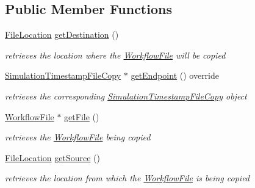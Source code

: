 \subsection*{Public Member Functions}
\begin{DoxyCompactItemize}
\item 
\hyperlink{structwrench_1_1_simulation_timestamp_file_copy_1_1_file_location}{File\+Location} \hyperlink{classwrench_1_1_simulation_timestamp_file_copy_a18c0be71ae79818fe8d0300b08bb2238}{get\+Destination} ()
\begin{DoxyCompactList}\small\item\em retrieves the location where the \hyperlink{classwrench_1_1_workflow_file}{Workflow\+File} will be copied \end{DoxyCompactList}\item 
\hyperlink{classwrench_1_1_simulation_timestamp_file_copy}{Simulation\+Timestamp\+File\+Copy} $\ast$ \hyperlink{classwrench_1_1_simulation_timestamp_file_copy_a2cd940b53a294459ebcab5bce823c9a0}{get\+Endpoint} () override
\begin{DoxyCompactList}\small\item\em retrieves the corresponding \hyperlink{classwrench_1_1_simulation_timestamp_file_copy}{Simulation\+Timestamp\+File\+Copy} object \end{DoxyCompactList}\item 
\hyperlink{classwrench_1_1_workflow_file}{Workflow\+File} $\ast$ \hyperlink{classwrench_1_1_simulation_timestamp_file_copy_a20275ad1b9f85099fed946e656420e1c}{get\+File} ()
\begin{DoxyCompactList}\small\item\em retrieves the \hyperlink{classwrench_1_1_workflow_file}{Workflow\+File} being copied \end{DoxyCompactList}\item 
\hyperlink{structwrench_1_1_simulation_timestamp_file_copy_1_1_file_location}{File\+Location} \hyperlink{classwrench_1_1_simulation_timestamp_file_copy_abde1808a7023d864ad0419cb9451d789}{get\+Source} ()
\begin{DoxyCompactList}\small\item\em retrieves the location from which the \hyperlink{classwrench_1_1_workflow_file}{Workflow\+File} is being copied \end{DoxyCompactList}\end{DoxyCompactItemize}

